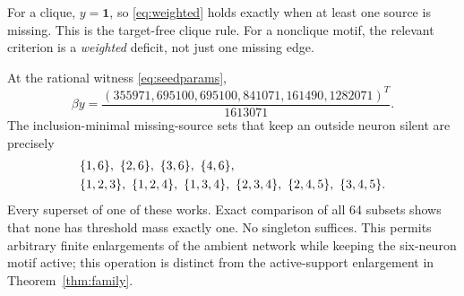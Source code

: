 \documentclass[11pt,a4paper]{article}
\theoremstyle{definition}\newtheorem{definition}[theorem]{Definition}
\theoremstyle{remark}\newtheorem{remark}[theorem]{Remark}
\newcommand{\ones}{\mathbf{1}}
\begin{document}
For a clique, $y=\ones$, so \eqref{eq:weighted} holds exactly when at least one source is missing. This is the target-free clique rule. For a nonclique motif, the relevant criterion is a \emph{weighted} deficit, not just one missing edge.

At the rational witness \eqref{eq:seedparams},
\begin{equation}\label{eq:weights}
 \beta y=\frac{(355971,695100,695100,841071,161490,1282071)^T}{1613071}.
\end{equation}
The inclusion-minimal missing-source sets that keep an outside neuron silent are precisely
\begin{align}\label{eq:antichain}
 &\{1,6\},\ \{2,6\},\ \{3,6\},\ \{4,6\},\notag\\
 &\{1,2,3\},\ \{1,2,4\},\ \{1,3,4\},\ \{2,3,4\},\
 \{2,4,5\},\ \{3,4,5\}.
\end{align}
Every superset of one of these works. Exact comparison of all 64 subsets shows that none has threshold mass exactly one. No singleton suffices. This permits arbitrary finite enlargements of the ambient network while keeping the six-neuron motif active; this operation is distinct from the active-support enlargement in Theorem~\ref{thm:family}.
\end{document}
